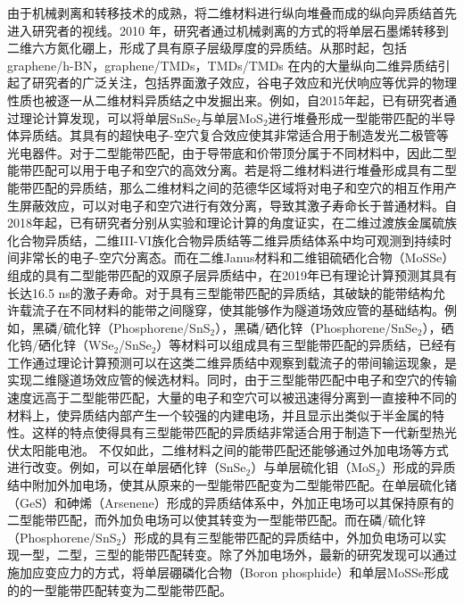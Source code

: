 由于机械剥离和转移技术的成熟，将二维材料进行纵向堆叠而成的纵向异质结首先进入研究者的视线。2010 年，研究者通过机械剥离的方式的将单层石墨烯转移到二维六方氮化硼上，形成了具有原子层级厚度的异质结。从那时起，包括 graphene/h-BN，graphene/TMDs，TMDs/TMDs 在内的大量纵向二维异质结引起了研究者的广泛关注，包括界面激子效应，谷电子效应和光伏响应等优异的物理性质也被逐一从二维材料异质结之中发掘出来。例如，自2015年起，已有研究者通过理论计算发现，可以将单层SnSe$_2$与单层MoS$_2$进行堆叠形成一型能带匹配的半导体异质结。其具有的超快电子-空穴复合效应使其非常适合用于制造发光二极管等光电器件。对于二型能带匹配，由于导带底和价带顶分属于不同材料中，因此二型能带匹配可以用于电子和空穴的高效分离。若是将二维材料进行堆叠形成具有二型能带匹配的异质结，那么二维材料之间的范德华区域将对电子和空穴的相互作用产生屏蔽效应，可以对电子和空穴进行有效分离，导致其激子寿命长于普通材料。自2018年起，已有研究者分别从实验和理论计算的角度证实，在二维过渡族金属硫族化合物异质结，二维III-VI族化合物异质结等二维异质结体系中均可观测到持续时间非常长的电子-空穴分离态。而在二维Janus材料和二维钼硫硒化合物（MoSSe）组成的具有二型能带匹配的双原子层异质结中，在2019年已有理论计算预测其具有长达16.5 ns的激子寿命。对于具有三型能带匹配的异质结，其破缺的能带结构允许载流子在不同材料的能带之间隧穿，使其能够作为隧道场效应管的基础结构。例如，黑磷/硫化锌（Phosphorene/SnS$_2$），黑磷/硒化锌（Phosphorene/SnSe$_2$），硒化钨/硒化锌（WSe$_2$/SnSe$_2$）等材料可以组成具有三型能带匹配的异质结，已经有工作通过理论计算预测可以在这类二维异质结中观察到载流子的带间输运现象，是实现二维隧道场效应管的候选材料。同时，由于三型能带匹配中电子和空穴的传输速度远高于二型能带匹配，大量的电子和空穴可以被迅速得分离到一直接种不同的材料上，使异质结内部产生一个较强的内建电场，并且显示出类似于半金属的特性。这样的特点使得具有三型能带匹配的异质结非常适合用于制造下一代新型热光伏太阳能电池。
不仅如此，二维材料之间的能带匹配还能够通过外加电场等方式进行改变。例如，可以在单层硒化锌（SnSe$_2$）与单层硫化钼（MoS$_2$）形成的异质结中附加外加电场，使其从原来的一型能带匹配变为二型能带匹配。在单层硫化锗（GeS）和砷烯（Arsenene）形成的异质结体系中，外加正电场可以其保持原有的二型能带匹配，而外加负电场可以使其转变为一型能带匹配。而在磷/硫化锌（Phosphorene/SnS$_2$）形成的具有三型能带匹配的异质结中，外加负电场可以实现一型，二型，三型的能带匹配转变。除了外加电场外，最新的研究发现可以通过施加应变应力的方式，将单层硼磷化合物（Boron phosphide）和单层MoSSe形成的的一型能带匹配转变为二型能带匹配。

